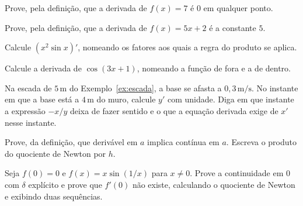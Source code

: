 \documentclass[11pt,a4paper]{article}
\begin{document}
\begin{exercicio}
Prove, pela defini\c{c}\~ao, que a derivada de $f(x)=7$ \'e $0$ em qualquer ponto.
\end{exercicio}

\begin{exercicio}
Prove, pela defini\c{c}\~ao, que a derivada de $f(x)=5x+2$ \'e a constante $5$.
\end{exercicio}

\begin{exercicio}
Calcule $(x^2\sin x)'$, nomeando os fatores aos quais a regra do produto se aplica.
\end{exercicio}

\begin{exercicio}
Calcule a derivada de $\cos(3x+1)$, nomeando a fun\c{c}\~ao de fora e a de dentro.
\end{exercicio}

\begin{exercicio}
Na escada de $5\,\mathrm{m}$ do Exemplo~\ref{ex:escada}, a base se afasta a $0{,}3\,\mathrm{m/s}$. No instante em que a base est\'a a $4\,\mathrm{m}$ do muro, calcule $y'$ com unidade. Diga em que instante a express\~ao $-x/y$ deixa de fazer sentido e o que a equa\c{c}\~ao derivada exige de $x'$ nesse instante.
\end{exercicio}

\begin{exercicio}
Prove, da defini\c{c}\~ao, que deriv\'avel em $a$ implica cont\'inua em $a$. Escreva o produto do quociente de Newton por $h$.
\end{exercicio}

\begin{exercicio}
Seja $f(0)=0$ e $f(x)=x\sin(1/x)$ para $x\neq 0$. Prove a continuidade em $0$ com $\delta$ expl\'icito e prove que $f'(0)$ n\~ao existe, calculando o quociente de Newton e exibindo duas sequ\^encias.
\end{exercicio}
\end{document}
